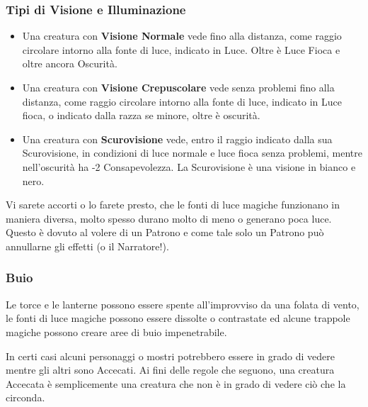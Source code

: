 \begin{multicols}{2}
\subsubsection{Tipi di Visione e Illuminazione}

\begin{itemize}[leftmargin=*] \setlength{\itemsep}{0pt}
\item
Una creatura con \textbf{Visione Normale} vede fino alla distanza, come raggio circolare intorno alla fonte di luce, indicato in Luce. Oltre è Luce Fioca e oltre ancora Oscurità.

\item
Una creatura con \textbf{Visione Crepuscolare} vede senza problemi fino alla distanza, come raggio circolare intorno alla fonte di luce, indicato in Luce fioca, o indicato dalla razza se minore, oltre è oscurità.

\item
Una creatura con \textbf{Scurovisione}  vede, entro il raggio indicato dalla sua Scurovisione, in condizioni di luce normale e luce fioca senza problemi, mentre nell'oscurità ha -2 Consapevolezza.
La Scurovisione è una visione in bianco e nero.
\end{itemize}

\begin{changemargin}{0.3cm}{0.3cm}\begin{tcolorbox}[title = Nota sulle fonti di luce]
Vi sarete accorti o lo farete presto, che le fonti di luce magiche funzionano in maniera diversa, molto spesso durano molto di meno o generano poca luce. Questo è dovuto al volere di un Patrono e come tale solo un Patrono può annullarne gli effetti (o il Narratore!).
\end{tcolorbox}\end{changemargin}

\subsubsection{Buio}

\label{buio}

Le torce e le lanterne possono essere spente all'improvviso da una folata di vento, le fonti di luce magiche possono essere dissolte o contrastate ed alcune trappole magiche possono creare aree di buio impenetrabile.

In certi casi alcuni personaggi o mostri potrebbero essere in grado di vedere mentre gli altri sono Accecati. Ai fini delle regole che seguono, una creatura Accecata è semplicemente una creatura che non è in grado di vedere ciò che la circonda.


\end{multicols}
